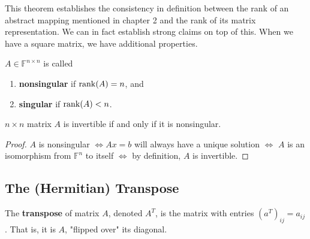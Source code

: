   This theorem establishes the consistency in definition between the rank of an abstract mapping mentioned in chapter 2 and the rank of its matrix representation. We can in fact establish strong claims on top of this. When we have a square matrix, we have additional properties. 

	\begin{definition}
	  \label{def:nonsingular-matrix}
		$A \in \mathbb{F}^{n \times n}$ is called 
		\begin{enumerate}
		  \item \textbf{nonsingular} if $\operatorname{rank}(A) = n$, and 
			\item \textbf{singular} if $\operatorname{rank}(A) < n$. 
		\end{enumerate}
  \end{definition}

	\begin{theorem}[Invertibility]
	  \label{thm:invertibility}
    $n \times n$ matrix $A$ is invertible if and only if it is nonsingular. 
  \end{theorem}
  \begin{proof}
    $A$ is nonsingular $\iff A x = b$ will always have a unique solution $\iff$ $A$ is an isomorphism from $\mathbb{F}^n$ to itself $\iff$ by definition, $A$ is invertible. 
  \end{proof}

\subsection{The (Hermitian) Transpose} 

  \begin{definition}
    \label{def:transpose-of-a-matrix}
    The \textbf{transpose} of matrix $A$, denoted $A^T$, is the matrix with entries $(a^T)_{i j} = a_{i j}$. That is, it is $A$, "flipped over" its diagonal. 
  \end{definition}

